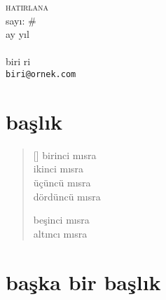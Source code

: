 \documentclass[9pt, a5paper, twocolumn, openright]{memoir}
\begin{document}
\thispagestyle{plain}
\noindent
{\HUGE\textsc{hatirlana}\\\small{}sayı: \#\\ay yıl}\\\\
{\small{}biri ri\\\texttt{biri@ornek.com}}
\bigskip
\section{başlık}
\lipsum[0-2]
\begin{verse}[\versewidth]
  birinci mısra \\
  ikinci mısra \\
  üçüncü mısra \\
  dördüncü mısra

  beşinci mısra \\
  altıncı mısra
\end{verse}
\section{başka bir başlık}
\lipsum[3-6]
\end{document}
